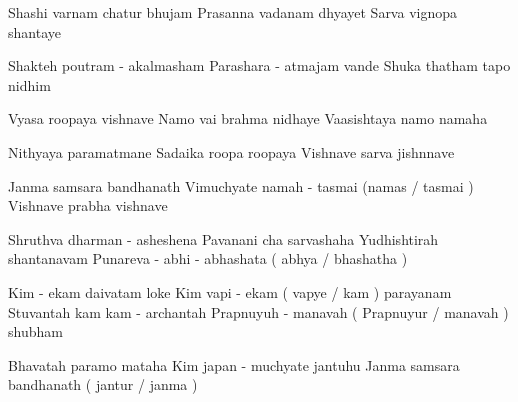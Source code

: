 \documentclass[20pt]{article}
\begin{document}

 {Shashi varnam chatur bhujam}
{Prasanna vadanam dhyayet} {Sarva vignopa shantaye  }


 {Shakteh poutram - akalmasham }
{Parashara - atmajam vande} {Shuka thatham tapo nidhim  }

 {Vyasa roopaya vishnave } 
{Namo vai brahma nidhaye } {Vaasishtaya namo namaha }

 {Nithyaya paramatmane } 
{Sadaika roopa roopaya } {Vishnave sarva jishnnave  }

 {Janma samsara bandhanath } 
{ Vimuchyate namah - tasmai (namas / tasmai ) } {Vishnave prabha vishnave }


{Shruthva dharman - asheshena }{Pavanani cha sarvashaha }
{Yudhishtirah shantanavam }{Punareva - abhi - abhashata ( abhya / bhashatha )}


{Kim - ekam daivatam loke } {Kim vapi - ekam ( vapye / kam ) parayanam}
{Stuvantah kam kam - archantah } {Prapnuyuh - manavah ( Prapnuyur / manavah ) shubham }

 {Bhavatah paramo mataha } 
{Kim japan - muchyate jantuhu } {Janma samsara bandhanath ( jantur / janma )  }
\end{document}
